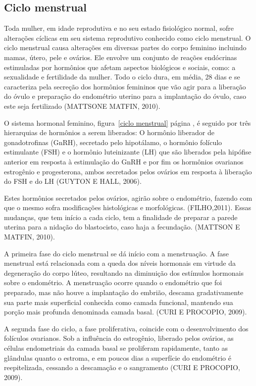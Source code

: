 \documentclass[12pt]{article} %
\begin{document}
\subsection{Ciclo menstrual}


Toda mulher, em idade reprodutiva e no seu estado fisiológico normal, sofre alterações cíclicas em
seu sistema reprodutivo conhecido como ciclo menstrual. O ciclo
menstrual causa alterações em diversas partes do corpo feminino
incluindo mamas, útero, pele e ovários. Ele envolve um conjunto de
reações endócrinas estimuladas por hormônios que afetam aspectos biológicos e
sociais, como: a sexualidade e fertilidade da
mulher. Todo o ciclo dura, em média, 28 dias e se caracteriza pela
secreção dos hormônios femininos que vão agir para a liberação do
óvulo e preparação do endométrio uterino para a implantação do óvulo,
caso este seja fertilizado (MATTSONE MATFIN, 2010).

O sistema hormonal feminino, figura~\ref{ciclo menstrual} página
\pageref{ciclo menstrual}, é seguido por três hierarquias de hormônios
a serem liberados: O hormônio liberador de gonadotrofinas (GnRH),
secretado pelo hipotálamo, o hormônio folículo estimulante (FSH) e o
hormônio luteinizante (LH) que são liberados pela hipófise anterior
em resposta à estimulação do GnRH e por fim os hormônios ovarianos
estrogênio e progesterona, ambos secretados pelos ovários em resposta
à liberação do FSH e do LH (GUYTON E HALL, 2006).


Estes hormônios secretados pelos ovários, agirão sobre o endométrio,
fazendo com que o mesmo sofra modificações histológicas e
morfológicas.  (FILHO,2011).  Essas mudanças, que
tem início a cada ciclo, tem a finalidade de preparar a parede uterina
para a nidação do blastocisto, caso haja a fecundação. (MATTSON E MATFIN, 2010).


A primeira fase do ciclo menstrual se dá início com a menstruação. A
fase menstrual está relacionada com a queda dos níveis hormonais em
virtude da degeneração do corpo lúteo, resultando na diminuição dos
estímulos hormonais sobre o endométrio. A menstruação ocorre quando o
endométrio que foi preparado, mas não houve a implantação do embrião,
descama gradativamente sua parte mais superficial conhecida como
camada funcional, mantendo sua porção mais profunda denominada camada
basal. (CURI E PROCOPIO, 2009).

A segunda fase do ciclo, a fase proliferativa, coincide com o
desenvolvimento dos folículos ovarianos. Sob a influência do
estrogênio, liberado pelos ovários, as células endometriais da camada
basal se proliferam rapidamente, tanto as glândulas quanto o estroma,
e em poucos dias a superfície do endométrio é reepitelizada, cessando
a descamação e o sangramento (CURI E PROCOPIO, 2009).
\end{document}
